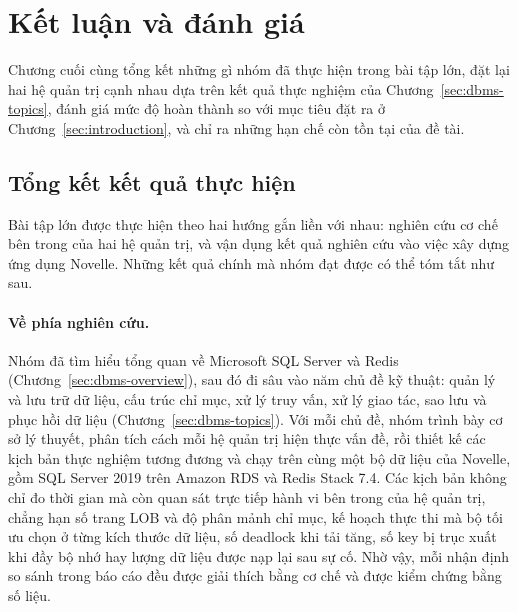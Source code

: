 \section{Kết luận và đánh giá}
\label{sec:conclusion}

Chương cuối cùng tổng kết những gì nhóm đã thực hiện trong bài tập lớn, đặt lại hai hệ quản trị cạnh nhau dựa trên kết quả thực nghiệm của Chương~\ref{sec:dbms-topics}, đánh giá mức độ hoàn thành so với mục tiêu đặt ra ở Chương~\ref{sec:introduction}, và chỉ ra những hạn chế còn tồn tại của đề tài.

\subsection{Tổng kết kết quả thực hiện}
\label{subsec:conclusion-summary}

Bài tập lớn được thực hiện theo hai hướng gắn liền với nhau: nghiên cứu cơ chế bên trong của hai hệ quản trị, và vận dụng kết quả nghiên cứu vào việc xây dựng ứng dụng Novelle. Những kết quả chính mà nhóm đạt được có thể tóm tắt như sau.

\paragraph{Về phía nghiên cứu.} Nhóm đã tìm hiểu tổng quan về Microsoft SQL Server và Redis (Chương~\ref{sec:dbms-overview}), sau đó đi sâu vào năm chủ đề kỹ thuật: quản lý và lưu trữ dữ liệu, cấu trúc chỉ mục, xử lý truy vấn, xử lý giao tác, sao lưu và phục hồi dữ liệu (Chương~\ref{sec:dbms-topics}). Với mỗi chủ đề, nhóm trình bày cơ sở lý thuyết, phân tích cách mỗi hệ quản trị hiện thực vấn đề, rồi thiết kế các kịch bản thực nghiệm tương đương và chạy trên cùng một bộ dữ liệu của Novelle, gồm SQL Server 2019 trên Amazon RDS và Redis Stack 7.4. Các kịch bản không chỉ đo thời gian mà còn quan sát trực tiếp hành vi bên trong của hệ quản trị, chẳng hạn số trang LOB và độ phân mảnh chỉ mục, kế hoạch thực thi mà bộ tối ưu chọn ở từng kích thước dữ liệu, số deadlock khi tải tăng, số key bị trục xuất khi đầy bộ nhớ hay lượng dữ liệu được nạp lại sau sự cố. Nhờ vậy, mỗi nhận định so sánh trong báo cáo đều được giải thích bằng cơ chế và được kiểm chứng bằng số liệu.

